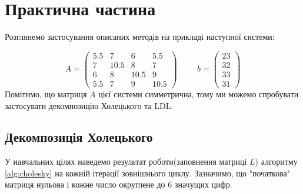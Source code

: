 \section*{\centering Практична частина}

Розглянемо застосування описаних методів на прикладі наступної системи:

\[
    A = \begin{pmatrix}
        5.5 & 7 & 6 & 5.5 \\
        7 & 10.5 & 8 & 7 \\
        6 & 8 & 10.5 & 9 \\
        5.5 & 7 & 9 & 10.5
    \end{pmatrix} \hspace{1cm}
    b = \begin{pmatrix}
        23 \\
        32 \\
        33 \\
        31
    \end{pmatrix}
\]
Помітимо, що матриця $A$ цієї системи симметрична,
тому ми можемо спробувати застосувати декомпозицію
Холецького та LDL.

\subsection*{Декомпозиція Холецького}

У навчальних цілях наведемо результат роботи(заповнення матриці $L$)
алгоритму \ref{alg:cholesky} на кожній ітерації зовнішнього циклу.
Зазначимо, що "початкова" матриця нульова і кожне число округлене
до 6 значущих цифр.

